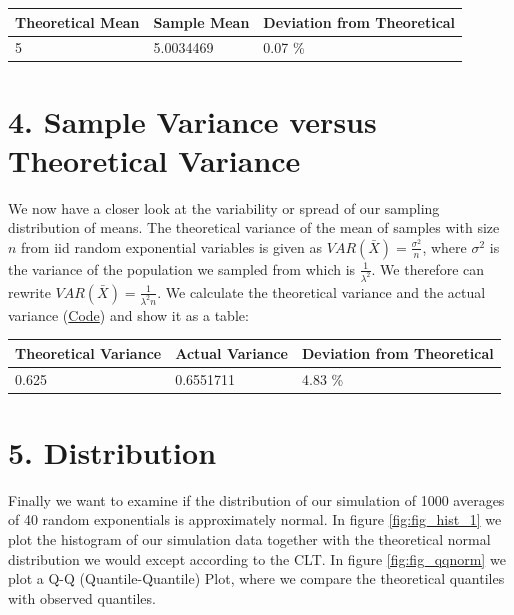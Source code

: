 \documentclass[]{article}
\begin{document}
\begin{longtable}[]{@{}lll@{}}
\toprule
Theoretical Mean & Sample Mean & Deviation from
Theoretical\tabularnewline
\midrule
\endhead
5 & 5.0034469 & 0.07 \%\tabularnewline
\bottomrule
\end{longtable}

\section{4. Sample Variance versus Theoretical
Variance}\label{sample-variance-versus-theoretical-variance}

We now have a closer look at the variability or spread of our sampling
distribution of means. The theoretical variance of the mean of samples
with size \(n\) from iid random exponential variables is given as
\(VAR(\bar X) = \frac{\sigma^2}{n}\), where \(\sigma^2\) is the variance
of the population we sampled from which is \(\frac{1}{\lambda^2}\). We
therefore can rewrite \(VAR(\bar X) = \frac{1}{\lambda^2 n}\). We
calculate the theoretical variance and the actual variance
(\protect\hyperlink{Appendix_4}{Code}) and show it as a table:

\begin{longtable}[]{@{}lll@{}}
\toprule
Theoretical Variance & Actual Variance & Deviation from
Theoretical\tabularnewline
\midrule
\endhead
0.625 & 0.6551711 & 4.83 \%\tabularnewline
\bottomrule
\end{longtable}

\section{5. Distribution}\label{distribution}

Finally we want to examine if the distribution of our simulation of 1000
averages of 40 random exponentials is approximately normal. In figure
\ref{fig:fig_hist_1} we plot the histogram of our simulation data
together with the theoretical normal distribution we would except
according to the CLT. In figure \ref{fig:fig_qqnorm} we plot a Q-Q
(Quantile-Quantile) Plot, where we compare the theoretical quantiles
with observed quantiles.
\end{document}
